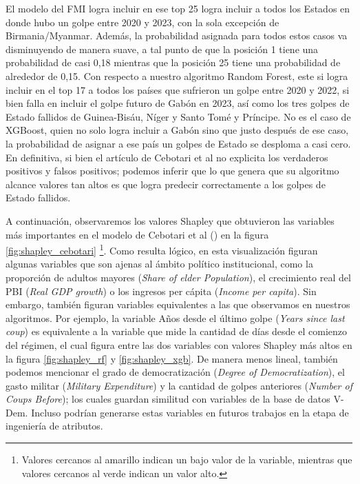 \documentclass{article}
\begin{document}
El modelo del FMI logra incluir en ese top 25 logra incluir a todos los Estados en donde hubo un golpe
entre 2020 y 2023, con la sola excepción de Birmania/Myanmar. Además, la probabilidad asignada para 
todos estos casos va disminuyendo de manera suave, a tal punto de que la posición 1 tiene una 
probabilidad de casi 0,18 mientras que la posición 25 tiene una probabilidad de alrededor de 0,15. Con
respecto a nuestro algoritmo Random Forest, este si logra incluir en el top 17 a todos los países que 
sufrieron un golpe entre 2020 y 2022, si bien falla en incluir el golpe futuro de Gabón en 2023, así como
los tres golpes de Estado fallidos de Guinea-Bisáu, Níger y Santo Tomé y Príncipe. No es 
el caso de XGBoost, quien no solo logra incluir a Gabón sino que justo después de ese caso, la 
probabilidad de asignar a ese país un golpes de Estado se desploma a casi cero. En definitiva, si bien 
el artículo de Cebotari et al no explicita los verdaderos positivos y falsos positivos; podemos inferir
que lo que genera que su algoritmo alcance valores tan altos es que logra predecir correctamente a los 
golpes de Estado fallidos.

A continuación, observaremos los valores Shapley que obtuvieron las variables más importantes en el
modelo de Cebotari et al (\citeyear{Ceb24}) en la figura \ref{fig:shapley_cebotari} \footnote{Valores 
cercanos al amarillo indican un bajo valor de la variable, mientras que valores cercanos al verde
indican un valor alto.}. Como resulta lógico, en esta visualización figuran algunas variables que son 
ajenas al ámbito político institucional, como
la proporción de adultos mayores (\textit{Share of elder Population}), el crecimiento real del PBI
(\textit{Real GDP growth}) o los ingresos per cápita (\textit{Income per capita}). Sin embargo, también
figuran variables equivalentes a las que observamos en nuestros algoritmos. Por ejemplo, la variable
Años desde el último golpe (\textit{Years since last coup}) es equivalente a la variable que mide la
cantidad de días desde el comienzo del régimen, el cual figura entre las dos variables con valores Shapley
más altos en la figura \ref{fig:shapley_rf} y \ref{fig:shapley_xgb}. De manera menos lineal, también podemos
mencionar el grado de democratización (\textit{Degree of Democratization}), el gasto militar (\textit{Military
Expenditure}) y la cantidad de golpes anteriores (\textit{Number of Coups Before}); los cuales guardan 
similitud con variables de la base de datos V-Dem. Incluso podrían generarse estas variables en futuros 
trabajos en la etapa de ingeniería de atributos.
\end{document}
